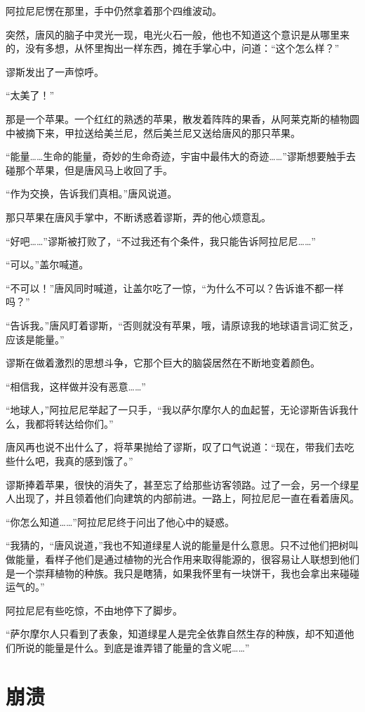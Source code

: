 阿拉尼尼愣在那里，手中仍然拿着那个四维波动。

突然，唐风的脑子中灵光一现，电光火石一般，他也不知道这个意识是从哪里来的，没有多想，从怀里掏出一样东西，摊在手掌心中，问道：“这个怎么样？”

谬斯发出了一声惊呼。

“太美了！”

那是一个苹果。一个红红的熟透的苹果，散发着阵阵的果香，从阿莱克斯的植物圆中被摘下来，甲拉送给美兰尼，然后美兰尼又送给唐风的那只苹果。

“能量……生命的能量，奇妙的生命奇迹，宇宙中最伟大的奇迹……”谬斯想要触手去碰那个苹果，但是唐风马上收回了手。

“作为交换，告诉我们真相。”唐风说道。

那只苹果在唐风手掌中，不断诱惑着谬斯，弄的他心烦意乱。

“好吧……”谬斯被打败了，“不过我还有个条件，我只能告诉阿拉尼尼……”

“可以。”盖尔喊道。

“不可以！”唐风同时喊道，让盖尔吃了一惊，“为什么不可以？告诉谁不都一样吗？”

“告诉我。”唐风盯着谬斯，“否则就没有苹果，哦，请原谅我的地球语言词汇贫乏，应该是能量。”

谬斯在做着激烈的思想斗争，它那个巨大的脑袋居然在不断地变着颜色。

“相信我，这样做并没有恶意……”

“地球人，”阿拉尼尼举起了一只手，“我以萨尔摩尔人的血起誓，无论谬斯告诉我什么，我都将转达给你们。”

唐风再也说不出什么了，将苹果抛给了谬斯，叹了口气说道：“现在，带我们去吃些什么吧，我真的感到饿了。”

谬斯捧着苹果，很快的消失了，甚至忘了给那些访客领路。过了一会，另一个绿星人出现了，并且领着他们向建筑的内部前进。一路上，阿拉尼尼一直在看着唐风。

“你怎么知道……”阿拉尼尼终于问出了他心中的疑惑。

“我猜的，“唐风说道，”我也不知道绿星人说的能量是什么意思。只不过他们把树叫做能量，看样子他们是通过植物的光合作用来取得能源的，很容易让人联想到他们是一个崇拜植物的种族。我只是瞎猜，如果我怀里有一块饼干，我也会拿出来碰碰运气的。”

阿拉尼尼有些吃惊，不由地停下了脚步。

“萨尔摩尔人只看到了表象，知道绿星人是完全依靠自然生存的种族，却不知道他们所说的能量是什么。到底是谁弄错了能量的含义呢……”

\chapter{崩溃}

